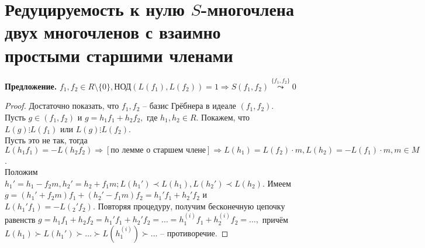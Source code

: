 \section{Редуцируемость к нулю $S$-многочлена двух многочленов с взаимно простыми старшими членами}

\textbf{Предложение.} $f_1, f_2 \in R \setminus \{0\}, \text{НОД} (L(f_1), L(f_2)) = 1 \Rightarrow S(f_1, f_2) \overset{\{f_1, f_2\}}{\leadsto} 0$
\begin{proof}
Достаточно показать, что $f_1, f_2$ -- базис Грёбнера в идеале $(f_1, f_2).$ \\
Пусть $g \in (f_1, f_2)$ и $g = h_1f_1 + h_2f_2,$ где $h_1, h_2 \in R.$ Покажем, что $L(g) \vdots L(f_1)$ или  $L(g) \vdots L(f_2).$\\
Пусть это не так, тогда $L(h_1f_1) = -L(h_2f_2) \Rightarrow [\text{по лемме о старшем члене}]\Rightarrow L(h_1) = L(f_2) \cdot m, L(h_2) = -L(f_1) \cdot m, m \in M$.\\
Положим $h_1' = h_1- f_2m, h_2' = h_2 + f_1m; L(h_1') \prec L(h_1), L(h_2') \prec L(h_2).$ Имеем $g = (h_1' + f_2m)f_1+ (h_2' - f_1m)f_2 = h_1'f_1 + h_2'f_2$ и $L(h_1'f_1) = -L(_2'f_2).$ Повторяя процедуру, получим бесконечную цепочку равенств 
$g = h_1f_1 + h_2f_2 = h_1'f_1+h_2'f_2 = \dotsc = h_1^{(i)}f_1 + h_2^{(i)} f_2 = \dotsc ,$ причём $L(h_1) \succ L(h_1') \succ\dotsc \succ L(h_1^{(i)}) \succ \dotsc$ -- противоречие.
\end{proof}